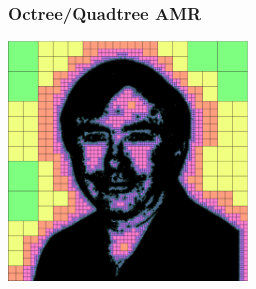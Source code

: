 \documentclass{beamer}
\begin{document}
\begin{frame}
\frametitle{Octree/Quadtree AMR}
\centerline{\includegraphics[width=2.5in]{norman-10.eps}}
\end{frame}

\begin{frame}
\frametitle{}

\end{frame}
\end{document}
